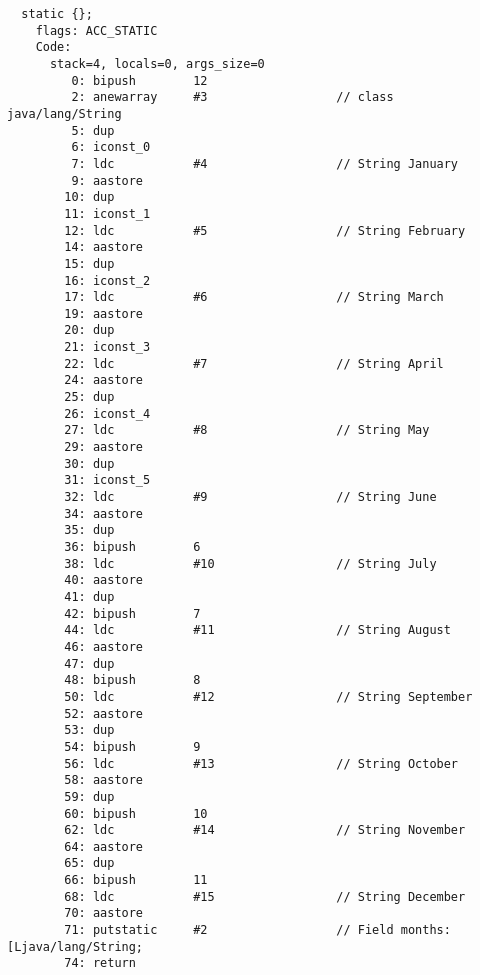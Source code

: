 \begin{lstlisting}
  static {};
    flags: ACC_STATIC
    Code:
      stack=4, locals=0, args_size=0
         0: bipush        12
         2: anewarray     #3                  // class java/lang/String
         5: dup           
         6: iconst_0      
         7: ldc           #4                  // String January
         9: aastore       
        10: dup           
        11: iconst_1      
        12: ldc           #5                  // String February
        14: aastore       
        15: dup           
        16: iconst_2      
        17: ldc           #6                  // String March
        19: aastore       
        20: dup           
        21: iconst_3      
        22: ldc           #7                  // String April
        24: aastore       
        25: dup           
        26: iconst_4      
        27: ldc           #8                  // String May
        29: aastore       
        30: dup           
        31: iconst_5      
        32: ldc           #9                  // String June
        34: aastore       
        35: dup           
        36: bipush        6
        38: ldc           #10                 // String July
        40: aastore       
        41: dup           
        42: bipush        7
        44: ldc           #11                 // String August
        46: aastore       
        47: dup           
        48: bipush        8
        50: ldc           #12                 // String September
        52: aastore       
        53: dup           
        54: bipush        9
        56: ldc           #13                 // String October
        58: aastore       
        59: dup           
        60: bipush        10
        62: ldc           #14                 // String November
        64: aastore       
        65: dup           
        66: bipush        11
        68: ldc           #15                 // String December
        70: aastore       
        71: putstatic     #2                  // Field months:[Ljava/lang/String;
        74: return        
\end{lstlisting}


